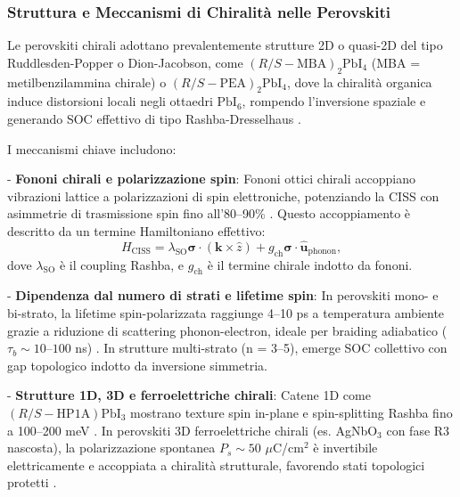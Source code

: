 \documentclass[11pt,a4paper]{article}
\let\oldcite\cite
\renewcommand{\cite}{\protect\oldcite}
\theoremstyle{plain}
\theoremstyle{definition}
\begin{document}
\subsubsection{Struttura e Meccanismi di Chiralità nelle Perovskiti}

Le perovskiti chirali adottano prevalentemente strutture 2D o quasi-2D del tipo Ruddlesden-Popper o Dion-Jacobson, come $(R/S-\text{MBA})_2\text{PbI}_4$ (MBA = metilbenzilammina chirale) o $(R/S-\text{PEA})_2\text{PbI}_4$, dove la chiralità organica induce distorsioni locali negli ottaedri $\text{PbI}_6$, rompendo l'inversione spaziale e generando SOC effettivo di tipo Rashba-Dresselhaus \cite{pols2025chiral, ramakrishnan2025layer}.

I meccanismi chiave includono:

- \textbf{Fononi chirali e polarizzazione spin}: Fononi ottici chirali accoppiano vibrazioni lattice a polarizzazioni di spin elettroniche, potenziando la CISS con asimmetrie di trasmissione spin fino all'80--90\% \cite{naaman2019spin, jung2024recent}. Questo accoppiamento è descritto da un termine Hamiltoniano effettivo:
  \begin{equation}
  H_{\text{CISS}} = \lambda_{\text{SO}} \boldsymbol{\sigma} \cdot (\mathbf{k} \times \hat{z}) + g_{\text{ch}} \boldsymbol{\sigma} \cdot \hat{\mathbf{u}}_{\text{phonon}},
  \label{eq:ciss_hamiltonian}
  \end{equation}
  dove $\lambda_{\text{SO}}$ è il coupling Rashba, e $g_{\text{ch}}$ è il termine chirale indotto da fononi.

- \textbf{Dipendenza dal numero di strati e lifetime spin}: In perovskiti mono- e bi-strato, la lifetime spin-polarizzata raggiunge 4--10 ps a temperatura ambiente grazie a riduzione di scattering phonon-electron, ideale per braiding adiabatico ($\tau_b \sim 10$--$100$ ns) \cite{ramakrishnan2025layer, dong2025chirality}. In strutture multi-strato (n = 3--5), emerge SOC collettivo con gap topologico indotto da inversione simmetria.

- \textbf{Strutture 1D, 3D e ferroelettriche chirali}: Catene 1D come $(R/S-\text{HP1A})\text{PbI}_3$ mostrano texture spin in-plane e spin-splitting Rashba fino a 100--200 meV \cite{li2025chiral}. In perovskiti 3D ferroelettriche chirali (es. AgNbO$_3$ con fase R3 nascosta), la polarizzazione spontanea $P_s \sim 50$ $\mu$C/cm$^2$ è invertibile elettricamente e accoppiata a chiralità strutturale, favorendo stati topologici protetti \cite{wang2025chiral3d, arxiv2602hidden}.
\end{document}
